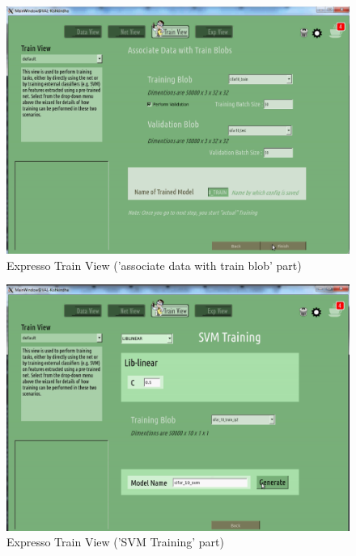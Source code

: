 \begin{figure}[!ht]
\center
    \includegraphics[scale=0.9]{images_expresso/07_train_blobs.png}
    \caption{Expresso Train View ('associate data with train blob' part)}
\end{figure}

\begin{figure}[!ht]
\center
    \includegraphics[scale=0.9]{images_expresso/08_train_svm.png}
    \caption{Expresso Train View ('SVM Training' part)}
\end{figure}

